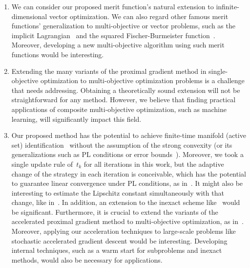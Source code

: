 \documentclass[../main]{subfiles}
\begin{document}
\begin{enumerate}
    \item We can consider our proposed merit function's natural extension to infinite-dimensional vector optimization.
        We can also regard other famous merit functions' generalization to multi-objective or vector problems, such as the implicit Lagrangian~\cite{Mangasarian1993} and the squared Fischer-Burmeister function~\cite{Kanzow1996}.
        Moreover, developing a new multi-objective algorithm using such merit functions would be interesting.

    \item Extending the many variants of the proximal gradient method in single-objective optimization to multi-objective optimization problems is a challenge that needs addressing.
        Obtaining a theoretically sound extension will not be straightforward for any method.
        However, we believe that finding practical applications of composite multi-objective optimization, such as machine learning, will significantly impact this field.

    \item Our proposed method has the potential to achieve finite-time manifold (active set) identification~\cite{Sun2019} without the assumption of the strong convexity (or its generalizations such as PL conditions or error bounds~\cite{Karimi2016}).
        Moreover, we took a single update rule of~$t_k$ for all iterations in this work, but the adaptive change of the strategy in each iteration is conceivable, which has the potential to guarantee linear convergence under PL conditions, as in~\cite{Aujol2021}.
        It might also be interesting to estimate the Lipschitz constant simultaneously with that change, like in~\cite{Scheinberg2014}.
        In addition, an extension to the inexact scheme like~\cite{Villa2013} would be significant.
        Furthermore, it is crucial to extend the variants of the accelerated proximal gradient method to multi-objective optimization, as in~\cite{Nishimura2022,Chen2022}.
        Moreover, applying our acceleration techniques to large-scale problems like stochastic accelerated gradient descent would be interesting.
        Developing internal techniques, such as a warm start for subproblems and inexact methods, would also be necessary for applications.
\end{enumerate}
\end{document}
